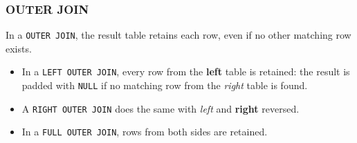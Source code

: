 \documentclass[english,serif,mathserif]{beamer}
\begin{document}
\def\ojoin{\setbox0=\hbox{$\Join$}%
  \rule[0.1ex]{.27em}{.4pt}\llap{\rule[1.3ex]{.27em}{.4pt}}}
\def\leftouterjoin{\mathbin{\ojoin\mkern-5.8mu\Join}}
\def\rightouterjoin{\mathbin{\Join\mkern-5.8mu\ojoin}}
\def\fullouterjoin{\mathbin{\ojoin\mkern-5.8mu\Join\mkern-5.8mu\ojoin}}

\begin{frame}
  \frametitle{OUTER JOIN}

  In a \texttt{OUTER JOIN}, the result table retains each row, even if no other
  matching row exists.

  \+
  \begin{itemize}
  \item In a \texttt{LEFT OUTER JOIN}, every row from the \textbf{left} table is
    retained: the result is padded with \texttt{NULL} if no matching row from
    the \emph{right} table is found.
  \item A \texttt{RIGHT OUTER JOIN} does the same with \emph{left} and
    \textbf{right} reversed.
  \item In a \texttt{FULL OUTER JOIN}, rows from both sides are retained.
  \end{itemize}
\end{frame}
\end{document}

